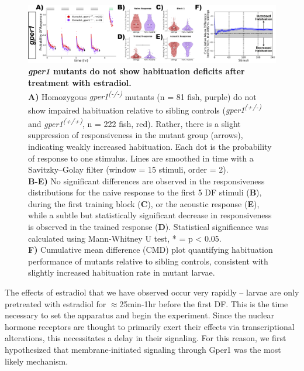 \documentclass[9pt,lineno]{RandlettLab_elife}
\begin{document}
{\begin{figure}
\begin{fullwidth}
\begin{center}
\includegraphics[width=0.8\linewidth]{figures/gper1Mutants.png}
\caption{\textbf{\emph{gper1} mutants do not show habituation deficits after treatment with estradiol.} \scriptsize
\\ \textbf{A)} Homozygous \emph{gper1\textsuperscript{(-/-)}} mutants (n = 81 fish, purple) do not show impaired habituation relative to sibling controls (\emph{gper1\textsuperscript{(+/-)}} and \emph{gper1\textsuperscript{(+/+)}}, n = 222 fish, red). Rather, there is a slight suppression of responsiveness in the mutant group (arrows), indicating weakly increased habituation. Each dot is the probability of response to one stimulus. Lines are smoothed in time with a Savitzky–Golay filter (window = 15 stimuli, order = 2).
\\ \textbf{B-E)} No significant differences are observed in the responsiveness distributions for the naive response to the first 5 DF stimuli (\textbf{B}), during the first training block (\textbf{C}), or the acoustic response (\textbf{E}), while a subtle but statistically significant decrease in responsiveness is observed in the trained response (\textbf{D}). Statistical significance was calculated using Mann-Whitney U test, * = p < 0.05.
\\ \textbf{F)} Cumulative mean difference (CMD) plot quantifying habituation performance of mutants relative to sibling controls, consistent with slightly increased habituation rate in mutant larvae. 
}
\label{fig:2}

\end{center}
\end{fullwidth}
\end{figure}

The effects of estradiol that we have observed occur very rapidly -- larvae are only pretreated with estradiol for $\approx$25min-1hr before the first DF. 
This is the time necessary to set the apparatus and begin the experiment.
Since the nuclear hormone receptors are thought to primarily exert their effects via transcriptional alterations, this necessitates a delay in their signaling.
For this reason, we first hypothesized that membrane-initiated signaling through Gper1 was the most likely mechanism. 

}
\end{document}
